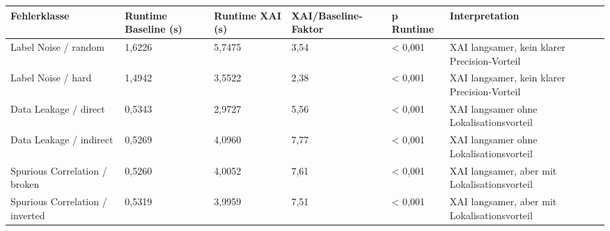 \begin{tabular}{llllll}
\toprule
Fehlerklasse & Runtime Baseline (s) & Runtime XAI (s) & XAI/Baseline-Faktor & p Runtime & Interpretation \\
\midrule
Label Noise / random & 1,6226 & 5,7475 & 3,54 & < 0,001 & XAI langsamer, kein klarer Precision-Vorteil \\
Label Noise / hard & 1,4942 & 3,5522 & 2,38 & < 0,001 & XAI langsamer, kein klarer Precision-Vorteil \\
Data Leakage / direct & 0,5343 & 2,9727 & 5,56 & < 0,001 & XAI langsamer ohne Lokalisationsvorteil \\
Data Leakage / indirect & 0,5269 & 4,0960 & 7,77 & < 0,001 & XAI langsamer ohne Lokalisationsvorteil \\
Spurious Correlation / broken & 0,5260 & 4,0052 & 7,61 & < 0,001 & XAI langsamer, aber mit Lokalisationsvorteil \\
Spurious Correlation / inverted & 0,5319 & 3,9959 & 7,51 & < 0,001 & XAI langsamer, aber mit Lokalisationsvorteil \\
\bottomrule
\end{tabular}
